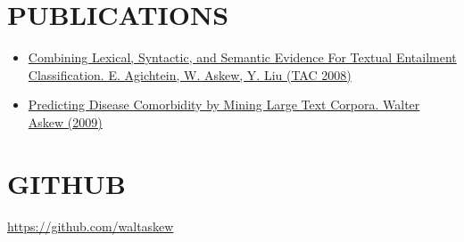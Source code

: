 \documentclass[line,margin]{res}
\begin{document}
\begin{resume}
\section{PUBLICATIONS}
\begin{itemize}
  \item \href{http://www.nist.gov/tac/publications/2008/participant.papers/Emory.proceedings.pdf}{Combining Lexical, Syntactic, and Semantic Evidence For
      Textual Entailment Classification.  E. Agichtein, W. Askew, Y. Liu
      (TAC 2008)}
  \item \href{https://etd.library.emory.edu/view/record/pid/emory:1b6tn}
    {Predicting Disease Comorbidity by Mining Large Text
      Corpora. Walter Askew (2009)}
\end{itemize}

\section{GITHUB}
\href{https://github.com/waltaskew}{https://github.com/waltaskew}

\end{resume}
\end{document}
